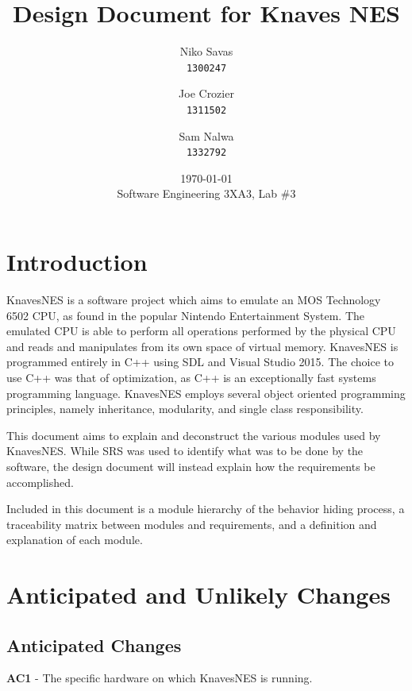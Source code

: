 \documentclass[12pt]{article}
\begin{document}
\title{Design Document for Knaves NES}
\date{\today\\
	{\medskip\small Software Engineering 3XA3, Lab \#3}
}
\author{Niko Savas\\
	\texttt{1300247}
	\and
	Joe Crozier\\
	\texttt{1311502}
	\and
	Sam Nalwa\\
	\texttt{1332792}
}

\maketitle
\clearpage

\tableofcontents
\clearpage

\section{Introduction}

KnavesNES is a software project which aims to emulate an MOS Technology 6502 CPU, as found in the popular Nintendo Entertainment System. The emulated CPU is able to perform all operations performed by the physical CPU and reads and manipulates from its own space of virtual memory. KnavesNES is programmed entirely in C++ using SDL and Visual Studio 2015. The choice to use C++ was that of optimization, as C++ is an exceptionally fast systems programming language. KnavesNES employs several object oriented programming principles, namely inheritance, modularity, and single class responsibility. 

This document aims to explain and deconstruct the various modules used by KnavesNES. While SRS was used to identify what was to be done by the software, the design document will instead explain how the requirements be accomplished. 

Included in this document is a module hierarchy of the behavior hiding process, a traceability matrix between modules and requirements, and a definition and explanation of each module.

\section{Anticipated and Unlikely Changes}
	\subsection{Anticipated Changes}
		\textbf{AC1} - The specific hardware on which KnavesNES is running.
\end{document}
